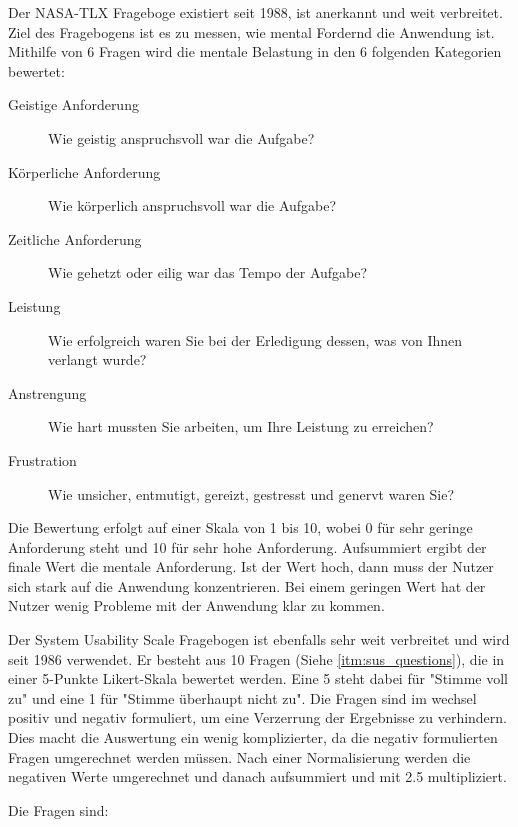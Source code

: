 Der NASA-TLX Frageboge existiert seit 1988, ist anerkannt und weit verbreitet. Ziel des Fragebogens ist es zu messen, wie mental Fordernd die Anwendung ist. 
Mithilfe von 6 Fragen wird die mentale Belastung in den 6 folgenden Kategorien bewertet:
\begin{description}
    \item[Geistige Anforderung] Wie geistig anspruchsvoll war die Aufgabe?
    \item[Körperliche Anforderung] Wie körperlich anspruchsvoll war die Aufgabe?
    \item[Zeitliche Anforderung] Wie gehetzt oder eilig war das Tempo der Aufgabe?
    \item[Leistung] Wie erfolgreich waren Sie bei der Erledigung dessen, was von Ihnen verlangt wurde?
    \item[Anstrengung] Wie hart mussten Sie arbeiten, um Ihre Leistung zu erreichen?
    \item[Frustration] Wie unsicher, entmutigt, gereizt, gestresst und genervt waren Sie?
\end{description}

Die Bewertung erfolgt auf einer Skala von 1 bis 10, wobei 0 für sehr geringe Anforderung steht und 10 für sehr hohe Anforderung. Aufsummiert ergibt der finale Wert die mentale Anforderung. Ist der Wert hoch, dann muss der Nutzer sich stark auf die Anwendung konzentrieren. 
Bei einem geringen Wert hat der Nutzer wenig Probleme mit der Anwendung klar zu kommen.

Der System Usability Scale Fragebogen ist ebenfalls sehr weit verbreitet und wird seit 1986 verwendet. Er besteht aus 10 Fragen (Siehe \ref{itm:sus_questions}), die in einer 5-Punkte Likert-Skala bewertet werden. Eine 5 steht dabei für "Stimme voll zu" und eine 1 für "Stimme überhaupt nicht zu". Die Fragen sind im wechsel 
positiv und negativ formuliert, um eine Verzerrung der Ergebnisse zu verhindern. Dies macht die Auswertung ein wenig komplizierter, da die negativ formulierten Fragen umgerechnet werden müssen. Nach einer Normalisierung werden die negativen Werte umgerechnet und danach aufsummiert und mit 2.5 multipliziert.

Die Fragen sind:

